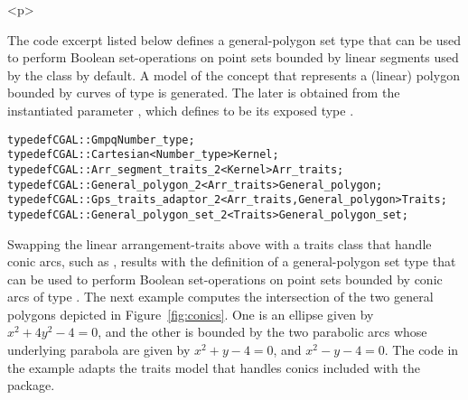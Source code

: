 \begin{ccHtmlOnly}<p>\end{ccHtmlOnly}
The code excerpt listed below defines a general-polygon set type that
can be used to perform Boolean set-operations on point sets bounded by
linear segments used by the  class by default. A
model of the  concept that represents a
(linear) polygon bounded by curves of type  is
generated. The later is obtained from the instantiated parameter
, which defines  to be
its exposed type .
\begin{alltt}
typedef CGAL::Gmpq                                             Number_type;
typedef CGAL::Cartesian<Number_type>                           Kernel;
typedef CGAL::Arr_segment_traits_2<Kernel>                     Arr_traits;
typedef CGAL::General_polygon_2<Arr_traits>                    General_polygon;
typedef CGAL::Gps_traits_adaptor_2<Arr_traits,General_polygon> Traits;
typedef CGAL::General_polygon_set_2<Traits>                    General_polygon_set;
\end{alltt}

Swapping the linear arrangement-traits 
above with a traits class that handle conic arcs, such as
, results with the definition of a
general-polygon set type that can be used to perform Boolean 
set-operations on point sets bounded by conic arcs of type
. The next example computes the intersection of the
two general polygons depicted in Figure~\ref{fig:conics}. One is an ellipse
given by $x^2 + 4y^2 - 4 = 0$, and the other is bounded by the two
parabolic arcs whose underlying parabola are given by 
$x^2 + y - 4 = 0$, and $x^2 - y - 4 = 0$. The code in the example adapts
the traits model that handles conics included with the 
package.


